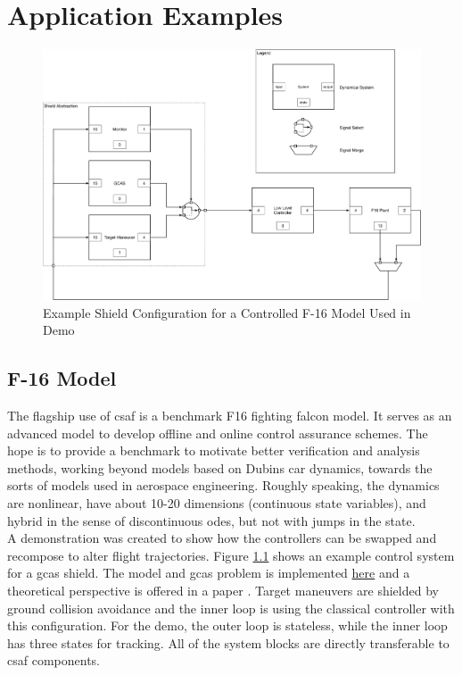 \chapter{Application Examples}

\begin{figure}[h]
\centering
\includegraphics[width=\linewidth]{./img/f16demoblock.pdf}
\caption{Example Shield Configuration for a Controlled F-16 Model Used in Demo}
\label{fig:f16demoblock}
\end{figure}

\section{F-16 Model}

The flagship use of \acrshort{csaf} is a benchmark F16 fighting falcon model. It serves as an advanced model to develop 
offline and online control assurance schemes. The hope is to provide a benchmark to motivate better 
verification and analysis methods, working beyond models based on Dubins car dynamics, towards the sorts of 
models used in aerospace engineering. Roughly speaking, the dynamics are nonlinear, have about 10-20 
dimensions (continuous state variables), and hybrid in the sense of discontinuous \acrshort{ode}s, but not with jumps in 
the state. \\

A demonstration was created to show how the controllers can be swapped and recompose to alter flight 
trajectories. Figure \ref{fig:f16demoblock} shows an example control system for a \acrlong{gcas} shield. The 
model and \acrshort{gcas} problem is implemented \href{https://github.com/stanleybak/AeroBenchVVPython}
{here} and a theoretical perspective is offered in a paper \cite{heidlauf2018verification}. Target maneuvers are shielded by ground collision avoidance and the inner loop is using the classical controller with this configuration. For the demo, the outer loop is stateless, while the inner loop has three states for tracking. All of the system blocks are directly transferable to \acrshort{csaf} components.

